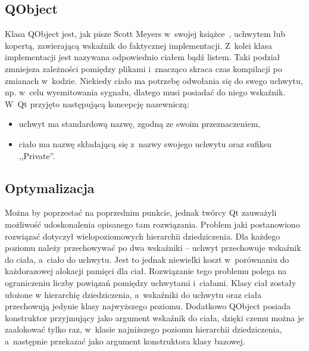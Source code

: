 \documentclass[11pt,twoside,a4paper,final]{llncs}
\begin{document}
\subsection{QObject}
Klasa QObject jest, jak pisze Scott Meyers w~swojej książce~\cite{meyers}, uchwytem lub kopertą, zawierającą wskaźnik do faktycznej implementacji. Z~kolei klasa implementacji jest nazywana odpowiednio ciałem bądź listem. Taki podział zmniejsza zależności pomiędzy plikami i~znacząco skraca czas kompilacji po zmianach w~kodzie.
Niekiedy ciało ma potrzebę odwołania się do swego uchwytu, np. w~celu wyemitowania sygnału, dlatego musi posiadać do niego wskaźnik. W~Qt przyjęto następującą koncepcję nazewniczą:
\begin{itemize}
\item{uchwyt ma standardową nazwę, zgodną ze swoim przeznaczeniem,}
\item{ciało ma nazwę składającą się z~nazwy swojego uchwytu oraz sufiksu ,,Private''.}
\end{itemize}

\subsection{Optymalizacja}
Można by poprzestać na poprzednim punkcie, jednak twórcy Qt zauważyli możliwość udoskonalenia opisanego tam rozwiązania.
Problem jaki postanowiono rozwiązać dotyczył wielopoziomowych hierarchii dziedziczenia. 
Dla każdego poziomu należy przechowywać po dwa wskaźniki -- uchwyt przechowuje wskaźnik do ciała, a~ciało do uchwytu. Jest to jednak niewielki koszt w~porównaniu do każdorazowej alokacji pamięci dla ciał.
Rozwiązanie tego problemu polega na ograniczeniu liczby powiązań pomiędzy uchwytami i~ciałami. Klasy ciał zostały ułożone w hierarchię dziedziczenia, a~wskaźniki do uchwytu oraz ciała przechowują jedynie klasy najwyższego poziomu. Dodatkowo QObject posiada konstruktor przyjmujący jako argument wskaźnik do ciała, dzięki czemu można je zaalokować tylko raz, w~klasie najniższego poziomu hierarchii dziedziczenia, a~następnie przekazać jako argument konstruktora klasy bazowej. 
\end{document}

